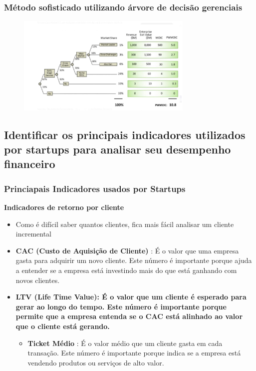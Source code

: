\documentclass{sciposter}
\begin{document}
\begin{multicols}{3}
\subsubsection*{\textbf{Método sofisticado utilizando árvore de decisão gerenciais}}

\begin{figure}[H]
    \centering
    \includegraphics[width=0.75\textwidth]{arvore.png}
\end{figure}

\subsection{\textbf{Identificar os principais indicadores utilizados por startups para analisar seu desempenho financeiro}}

\subsubsection*{\textbf{Princiapais Indicadores usados por Startups}}
\textbf{Indicadores de retorno por cliente} \begin{itemize}
    \item Como é difícil saber quantos clientes, fica mais fácil analisar um cliente incremental
    \item \textbf{CAC (Custo de Aquisição de Cliente)} : É o valor que uma empresa gasta para adquirir um novo cliente. Este número é importante porque ajuda a entender se a empresa está investindo mais do que está ganhando com novos clientes.
    \item \textbf{LTV (Life Time Value): É o valor que um cliente é esperado para gerar ao longo do tempo. Este número é importante porque permite que a empresa entenda se o CAC está alinhado ao valor que o cliente está gerando.} \begin{itemize}
        \item \textbf{Ticket Médio} : É o valor médio que um cliente gasta em cada transação. Este número é importante porque indica se a empresa está vendendo produtos ou serviços de alto valor.
    \end{itemize}
\end{itemize}


\end{multicols}
\end{document}
